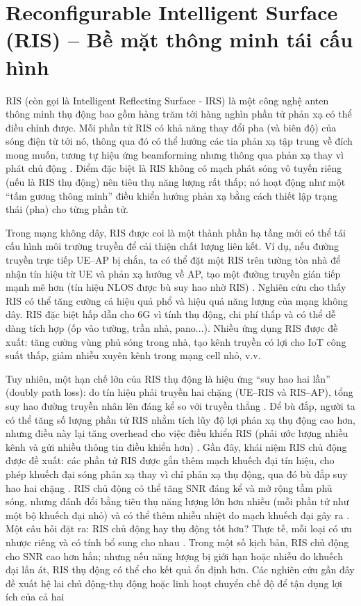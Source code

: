\section{Reconfigurable Intelligent Surface (RIS) – Bề mặt thông minh tái cấu hình}

RIS (còn gọi là Intelligent Reflecting Surface - IRS) là một công nghệ anten thông minh thụ động bao gồm hàng trăm tới hàng nghìn phần tử phản xạ có thể điều chỉnh được. Mỗi phần tử RIS có khả năng thay đổi pha (và biên độ) của sóng điện từ tới nó, thông qua đó có thể hướng các tia phản xạ tập trung về đích mong muốn, tương tự hiệu ứng beamforming nhưng thông qua phản xạ thay vì phát chủ động \cite{mec}. Điểm đặc biệt là RIS không có mạch phát sóng vô tuyến riêng (nếu là RIS thụ động) nên tiêu thụ năng lượng rất thấp; nó hoạt động như một “tấm gương thông minh” điều khiển hướng phản xạ bằng cách thiết lập trạng thái (pha) cho từng phần tử. 


Trong mạng không dây, RIS được coi là một thành phần hạ tầng mới có thể tái cấu hình môi trường truyền để cải thiện chất lượng liên kết. Ví dụ, nếu đường truyền trực tiếp UE–AP bị chắn, ta có thể đặt một RIS trên tường tòa nhà để nhận tín hiệu từ UE và phản xạ hướng về AP, tạo một đường truyền gián tiếp mạnh mẽ hơn (tín hiệu NLOS được bù suy hao nhờ RIS) \cite{ris_latency}. Nghiên cứu cho thấy RIS có thể tăng cường cả hiệu quả phổ và hiệu quả năng lượng của mạng không dây. RIS đặc biệt hấp dẫn cho 6G vì tính thụ động, chi phí thấp và có thể dễ dàng tích hợp (ốp vào tường, trần nhà, pano...). Nhiều ứng dụng RIS được đề xuất: tăng cường vùng phủ sóng trong nhà, tạo kênh truyền có lợi cho IoT công suất thấp, giảm nhiễu xuyên kênh trong mạng cell nhỏ, v.v.


Tuy nhiên, một hạn chế lớn của RIS thụ động là hiệu ứng “suy hao hai lần” (doubly path loss): do tín hiệu phải truyền hai chặng (UE–RIS và RIS–AP), tổng suy hao đường truyền nhân lên đáng kể so với truyền thẳng
\cite{mec}
. Để bù đắp, người ta có thể tăng số lượng phần tử RIS nhằm tích lũy độ lợi phản xạ thụ động cao hơn, nhưng điều này lại tăng overhead cho việc điều khiển RIS (phải ước lượng nhiều kênh và gửi nhiều thông tin điều khiển hơn)
. Gần đây, khái niệm RIS chủ động được đề xuất: các phần tử RIS được gắn thêm mạch khuếch đại tín hiệu, cho phép khuếch đại sóng phản xạ thay vì chỉ phản xạ thụ động, qua đó bù đắp suy hao hai chặng
. RIS chủ động có thể tăng SNR đáng kể và mở rộng tầm phủ sóng, nhưng đánh đổi bằng tiêu thụ năng lượng lớn hơn nhiều (mỗi phần tử như một bộ khuếch đại nhỏ) và có thể thêm nhiễu nhiệt do mạch khuếch đại gây ra
. Một câu hỏi đặt ra: RIS chủ động hay thụ động tốt hơn? Thực tế, mỗi loại có ưu nhược riêng và có tính bổ sung cho nhau
. Trong một số kịch bản, RIS chủ động cho SNR cao hơn hẳn; nhưng nếu năng lượng bị giới hạn hoặc nhiễu do khuếch đại lấn át, RIS thụ động có thể cho kết quả ổn định hơn. Các nghiên cứu gần đây đề xuất hệ lai chủ động-thụ động hoặc linh hoạt chuyển chế độ để tận dụng lợi ích của cả hai